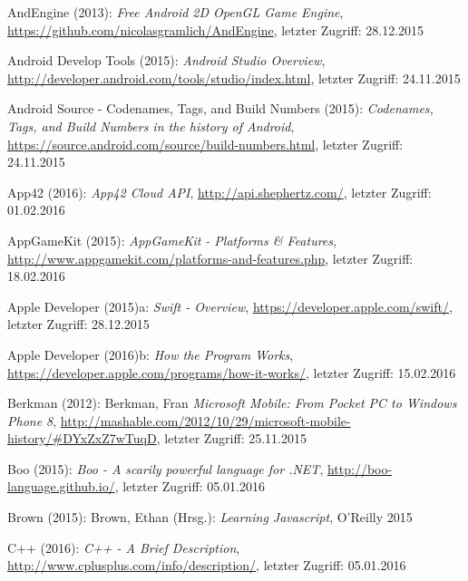 \begin{thebibliography}{}
	
AndEngine (2013): \emph{Free Android 2D OpenGL Game Engine},
\url{https://github.com/nicolasgramlich/AndEngine}, letzter Zugriff: 28.12.2015

Android Develop Tools (2015): \emph{Android Studio Overview},
\url{http://developer.android.com/tools/studio/index.html}, letzter Zugriff: 24.11.2015

Android Source - Codenames, Tags, and Build Numbers (2015):
\emph{Codenames, Tags, and Build Numbers in the history of Android},
\url{https://source.android.com/source/build-numbers.html}, letzter Zugriff: 24.11.2015

App42 (2016): \emph{App42 Cloud API},
\url{http://api.shephertz.com/}, letzter Zugriff: 01.02.2016

AppGameKit (2015): \emph{AppGameKit - Platforms \& Features},
\url{http://www.appgamekit.com/platforms-and-features.php}, letzter Zugriff: 18.02.2016

Apple Developer (2015)a: \emph{Swift - Overview},
\url{https://developer.apple.com/swift/}, letzter Zugriff: 28.12.2015

Apple Developer (2016)b: \emph{How the Program Works},
\url{https://developer.apple.com/programs/how-it-works/}, letzter Zugriff: 15.02.2016

Berkman (2012): Berkman, Fran \emph{Microsoft Mobile: From Pocket PC to Windows Phone 8},
\url{http://mashable.com/2012/10/29/microsoft-mobile-history/#DYxZxZ7wTuqD}, letzter Zugriff: 25.11.2015

Boo (2015): \emph{Boo - A scarily powerful language for .NET},
\url{http://boo-language.github.io/}, letzter Zugriff: 05.01.2016

Brown (2015): Brown, Ethan (Hrsg.): 
\emph{Learning Javascript}, O'Reilly 2015

C++ (2016): \emph{C++ - A Brief Description},
\url{http://www.cplusplus.com/info/description/}, letzter Zugriff: 05.01.2016


\end{thebibliography}
